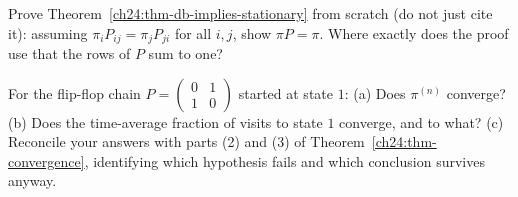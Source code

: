 \begin{exercise}
Prove Theorem~\ref{ch24:thm-db-implies-stationary} from scratch (do not just cite
it): assuming $\pi_i P_{ij} = \pi_j P_{ji}$ for all $i,j$, show $\pi P = \pi$.
Where exactly does the proof use that the rows of $P$ sum to one?
\end{exercise}

\begin{exercise}
For the flip-flop chain $P=\left(\begin{smallmatrix}0&1\\1&0\end{smallmatrix}\right)$
started at state $1$: (a) Does $\pi^{(n)}$ converge? (b) Does the time-average
fraction of visits to state $1$ converge, and to what? (c) Reconcile your answers
with parts (2) and (3) of Theorem~\ref{ch24:thm-convergence}, identifying which
hypothesis fails and which conclusion survives anyway.
\end{exercise}

